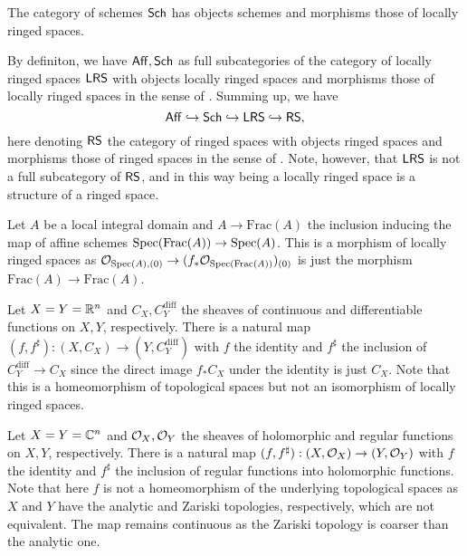 \begin{definition}\label{def: category of schemes}
    The category of schemes $\mathsf{Sch}$ has objects schemes and morphisms those of locally ringed spaces. 
\end{definition}
By definiton, we have $\mathsf{Aff},\mathsf{Sch}$ as full subcategories of the category of locally ringed spaces $\mathsf{LRS}$ with objects locally ringed spaces and morphisms those of locally ringed spaces in the sense of . Summing up, we have 
$$\mathsf{Aff}\hookrightarrow\mathsf{Sch}\hookrightarrow\mathsf{LRS}\hookrightarrow\mathsf{RS},$$
here denoting $\mathsf{RS}$ the category of ringed spaces with objects ringed spaces and morphisms those of ringed spaces in the sense of . Note, however, that $\mathsf{LRS}$ is not a full subcategory of $\mathsf{RS}$, and in this way being a locally ringed space is a structure of a ringed space.
\begin{example}
    Let $A$ be a local integral domain and $A\to\mathrm{Frac}(A)$ the inclusion inducing the map of affine schemes $\operatorname{Spec}(\mathrm{Frac}(A))\to\operatorname{Spec}(A)$. This is a morphism of locally ringed spaces as $\mathcal{O}_{\operatorname{Spec}(A),(0)}\to (f_{*}\mathcal{O}_{\operatorname{Spec}(\mathrm{Frac}(A))})_{(0)}$ is just the morphism $\mathrm{Frac}(A)\to\mathrm{Frac}(A)$. 
\end{example}
\begin{example}
    Let $X=Y=\mathbb{R}^{n}$ and $C_{X},C_{Y}^{\mathrm{diff}}$ the sheaves of continuous and differentiable functions on $X,Y$, respectively. There is a natural map $(f,f^{\sharp}):(X,C_{X})\to (Y,C_{Y}^{\mathrm{diff}})$ with $f$ the identity and $f^{\sharp}$ the inclusion of $C_{Y}^{\mathrm{diff}}\to C_{X}$ since the direct image $f_{*}C_{X}$ under the identity is just $C_{X}$. Note that this is a homeomorphism of topological spaces but not an isomorphism of locally ringed spaces. 
\end{example}
\begin{example}
    Let $X=Y=\mathbb{C}^{n}$ and $\mathcal{O}_{X},\mathcal{O}_{Y}$ the sheaves of holomorphic and regular functions on $X,Y$, respectively. There is a natural map $(f,f^{\sharp}):(X,\mathcal{O}_{X})\to (Y,\mathcal{O}_{Y})$ with $f$ the identity and $f^{\sharp}$ the inclusion of regular functions into holomorphic functions. Note that here $f$ is not a homeomorphism of the underlying topological spaces as $X$ and $Y$ have the analytic and Zariski topologies, respectively, which are not equivalent. The map remains continuous as the Zariski topology is coarser than the analytic one. 
\end{example}
